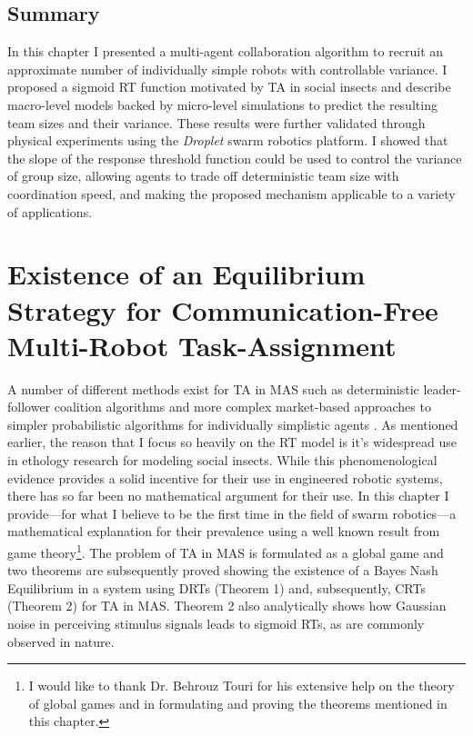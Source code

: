 \documentclass[defaultstyle,12pt]{proposal}
\begin{document}
\section{Summary}
In this chapter I presented a multi-agent collaboration algorithm to recruit an approximate number of individually simple robots with controllable variance. I proposed a sigmoid RT function motivated by TA in social insects and describe macro-level models backed by micro-level simulations to predict the resulting team sizes and their variance.  These results were further validated through physical experiments using the \emph{Droplet} swarm robotics platform. I showed that the slope of the response threshold function could be used to control the variance of group size, allowing agents to trade off deterministic team size with coordination speed, and making the proposed mechanism applicable to a variety of applications.

\chapter{Existence of an Equilibrium Strategy for Communication-Free Multi-Robot Task-Assignment}\label{ch:existeqrtm}
A number of different methods exist for TA in MAS such as deterministic leader-follower coalition algorithms \cite{Chen2011} and more complex market-based approaches \cite{Amstutz2008} to simpler probabilistic algorithms for individually simplistic agents \cite{Dantu2012}. As mentioned earlier, the reason that I focus so heavily on the RT model is it's widespread use in ethology research for modeling social insects. While this phenomenological evidence provides a solid incentive for their use in engineered robotic systems, there has so far been no mathematical argument for their use. In this chapter I provide---for what I believe to be the first time in the field of swarm robotics---a mathematical explanation for their prevalence using a well known result from game theory\footnote{I would like to thank Dr. Behrouz Touri for his extensive help on the theory of global games and in formulating and proving the theorems mentioned in this chapter.}. The problem of TA in MAS is formulated as a global game and two theorems are subsequently proved showing the existence of a Bayes Nash Equilibrium in a system using DRTs (Theorem 1) and, subsequently, CRTs (Theorem 2) for TA in MAS. Theorem 2 also analytically shows how Gaussian noise in perceiving stimulus signals leads to sigmoid RTs, as are commonly observed in nature.
\end{document}
